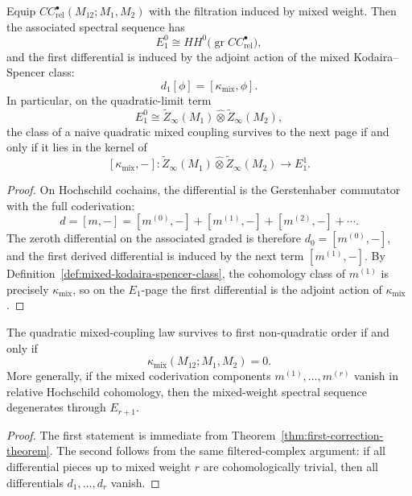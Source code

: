 \begin{theorem}
\label{thm:first-correction-theorem}
Equip $CC^\bullet_{\mathrm{rel}}(M_{12};M_1,M_2)$ with the filtration induced by mixed weight.  Then the associated spectral sequence has
\[
E_1^0 \cong HH^0\bigl(\operatorname{gr} CC^\bullet_{\mathrm{rel}}\bigr),
\]
and the first differential is induced by the adjoint action of the mixed Kodaira--Spencer class:
\[
d_1[\phi] = [\kappa_{\mathrm{mix}},\phi].
\]
In particular, on the quadratic-limit term
\[
E_1^0 \cong \widetilde Z_\infty(M_1)\widehat\otimes \widetilde Z_\infty(M_2),
\]
the class of a naive quadratic mixed coupling survives to the next page if and only if it lies in the kernel of
\[
[\kappa_{\mathrm{mix}},-] :
\widetilde Z_\infty(M_1)\widehat\otimes \widetilde Z_\infty(M_2)
\longrightarrow E_1^1.
\]
\end{theorem}

\begin{proof}
On Hochschild cochains, the differential is the Gerstenhaber commutator with the full coderivation:
\[
d = [m,-] = [m^{(0)},-] + [m^{(1)},-] + [m^{(2)},-] + \cdots.
\]
The zeroth differential on the associated graded is therefore $d_0=[m^{(0)},-]$, and the first derived differential is induced by the next term $[m^{(1)},-]$.  By Definition~\ref{def:mixed-kodaira-spencer-class}, the cohomology class of $m^{(1)}$ is precisely $\kappa_{\mathrm{mix}}$, so on the $E_1$-page the first differential is the adjoint action of $\kappa_{\mathrm{mix}}$.
\end{proof}

\begin{corollary}
\label{cor:persistence-criterion-quadratic-law}
The quadratic mixed-coupling law survives to first non-quadratic order if and only if
\[
\kappa_{\mathrm{mix}}(M_{12};M_1,M_2)=0.
\]
More generally, if the mixed coderivation components $m^{(1)},\dots,m^{(r)}$ vanish in relative Hochschild cohomology, then the mixed-weight spectral sequence degenerates through $E_{r+1}$.
\end{corollary}

\begin{proof}
The first statement is immediate from Theorem~\ref{thm:first-correction-theorem}.  The second follows from the same filtered-complex argument: if all differential pieces up to mixed weight $r$ are cohomologically trivial, then all differentials $d_1,\dots,d_r$ vanish.
\end{proof}


